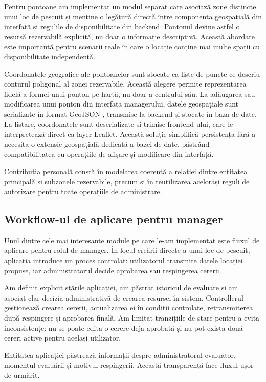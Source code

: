 Pentru pontoane am implementat un modul separat care asociază zone distincte unui loc de pescuit și menține o legătură directă între componenta geospațială din interfață și regulile de disponibilitate din backend. Pontonul devine astfel o resursă rezervabilă explicită, nu doar o informație descriptivă. Această abordare este importantă pentru scenarii reale în care o locație conține mai multe spații cu disponibilitate independentă.

Coordonatele geografice ale pontoanelor sunt stocate ca liste de puncte ce descriu conturul poligonal al zonei rezervabile. Această alegere permite reprezentarea fidelă a formei unui ponton pe hartă, nu doar a centrului său. La adăugarea sau modificarea unui ponton din interfața managerului, datele geospațiale sunt serializate în format GeoJSON \citep{geojson}, transmise la backend și stocate în baza de date. La listare, coordonatele sunt deserializate și trimise frontend-ului, care le interpretează direct ca layer Leaflet. Această soluție simplifică persistența fără a necesita o extensie geospațială dedicată a bazei de date, păstrând compatibilitatea cu operațiile de afișare și modificare din interfață.

Contribuția personală constă în modelarea coerentă a relației dintre entitatea principală și subzonele rezervabile, precum și în reutilizarea acelorași reguli de autorizare pentru toate operațiile de administrare.

\subsection{Workflow-ul de aplicare pentru manager}

Unul dintre cele mai interesante module pe care le-am implementat este fluxul de aplicare pentru rolul de manager. În locul creării directe a unui loc de pescuit, aplicația introduce un proces controlat: utilizatorul transmite datele locației propuse, iar administratorul decide aprobarea sau respingerea cererii.

Am definit explicit stările aplicației, am păstrat istoricul de evaluare și am asociat clar decizia administrativă de crearea resursei în sistem. Controllerul gestionează crearea cererii, actualizarea ei în condiții controlate, retransmiterea după respingere și aprobarea finală. Am limitat tranzițiile de stare pentru a evita inconsistențe: nu se poate edita o cerere deja aprobată și nu pot exista două cereri active pentru același utilizator.

Entitatea aplicației păstrează informații despre administratorul evaluator, momentul evaluării și motivul respingerii. Această transparență face fluxul ușor de urmărit.

